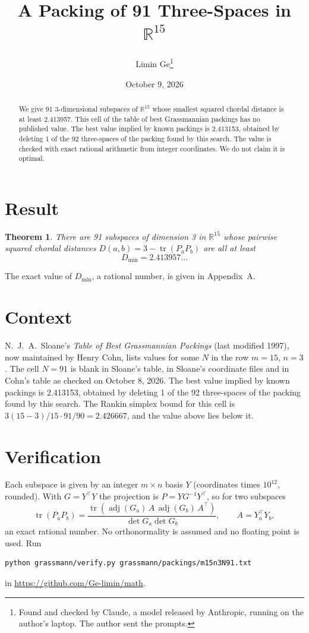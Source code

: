 \documentclass[11pt,a4paper]{article}
\title{A Packing of 91 Three-Spaces in $\mathbb{R}^{15}$}
\author{Limin Ge\thanks{Found and checked by Claude, a model released by Anthropic, running on the author's laptop. The author sent the prompts.}}
\date{October 9, 2026}
\newtheorem*{theorem}{Theorem}
\begin{document}
\maketitle
\begin{abstract}
We give 91 3-dimensional subspaces of $\mathbb{R}^{15}$ whose smallest squared chordal distance is at least 2.413957. This cell of the table of best Grassmannian packings has no published value. The best value implied by known packings is 2.413153, obtained by deleting 1 of the 92 three-spaces of the packing found by this search. The value is checked with exact rational arithmetic from integer coordinates. We do not claim it is optimal.
\end{abstract}

\section{Result}
\begin{theorem}
There are 91 subspaces of dimension 3 in $\mathbb{R}^{15}$ whose pairwise squared chordal distances $D(a,b) = 3 - \operatorname{tr}(P_aP_b)$ are all at least
\[ D_{\min} = 2.413957\ldots \]
\end{theorem}
The exact value of $D_{\min}$, a rational number, is given in Appendix~A.


\section{Context}
N.~J.~A.~Sloane's \emph{Table of Best Grassmannian Packings} (last modified 1997), now maintained by Henry Cohn, lists values for some $N$ in the row $m=15$, $n=3$. The cell $N=91$ is blank in Sloane's table, in Sloane's coordinate files and in Cohn's table as checked on October 8, 2026. The best value implied by known packings is 2.413153, obtained by deleting 1 of the 92 three-spaces of the packing found by this search. The Rankin simplex bound for this cell is $3(15-3)/15\cdot 91/90 = 2.426667$, and the value above lies below it.


\section{Verification}
Each subspace is given by an integer $m\times n$ basis $Y$ (coordinates times $10^{12}$, rounded). With $G=Y^\top Y$ the projection is $P=YG^{-1}Y^\top$, so for two subspaces
\[ \operatorname{tr}(P_aP_b)=\frac{\operatorname{tr}(\operatorname{adj}(G_a)\,A\,\operatorname{adj}(G_b)\,A^\top)}{\det G_a\det G_b},\qquad A=Y_a^\top Y_b, \]
an exact rational number. No orthonormality is assumed and no floating point is used. Run
\begin{verbatim}
python grassmann/verify.py grassmann/packings/m15n3N91.txt
\end{verbatim}
in \url{https://github.com/Ge-limin/math}.
\end{document}
